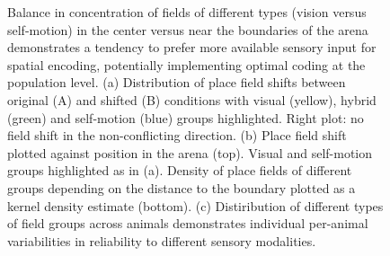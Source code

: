 \begin{figure}
\captionsetup{format=plain}
\caption[Balance between vision and self-motion]{
Balance in concentration of fields of different types (vision versus self-motion) in the center versus near the boundaries of the arena demonstrates a tendency to prefer more available sensory input for spatial encoding, potentially implementing optimal coding at the population level. (a) Distribution of place field shifts between original (A) and shifted (B) conditions with visual (yellow), hybrid (green) and self-motion (blue) groups highlighted. Right plot: no field shift in the non-conflicting direction. (b) Place field shift plotted against position in the arena (top). Visual and self-motion groups highlighted as in (a). Density of place fields of different groups depending on the distance to the boundary plotted as a kernel density estimate (bottom). (c) Distiribution of different types of field groups across animals demonstrates individual per-animal variabilities in reliability to different sensory modalities.
}
\label{fig:F19_balance_field_concentration}
\end{figure}


